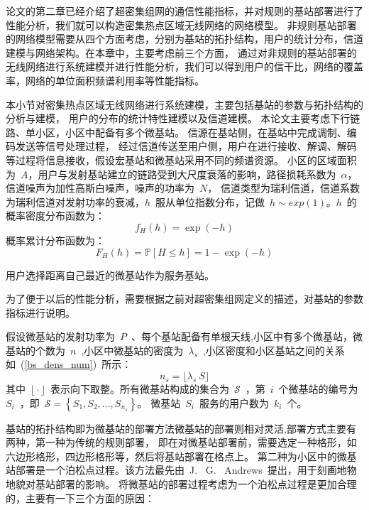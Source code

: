 

论文的第二章已经介绍了超密集组网的通信性能指标，并对规则的基站部署进行了性能分析，我们就可以构造密集热点区域无线网络的网络模型。
非规则基站部署的网络模型需要从四个方面考虑，分别为基站的拓扑结构，用户的统计分布，信道建模与网络架构。在本章中，主要考虑前三个方面，
通过对非规则的基站部署的无线网络进行系统建模并进行性能分析，我们可以得到用户的信干比，网络的覆盖率，网络的单位面积频谱利用率等性能指标。

本小节对密集热点区域无线网络进行系统建模，主要包括基站的参数与拓扑结构的分析与建模，
用户的分布的统计特性建模以及信道建模。
本论文主要考虑下行链路、单小区，小区中配备有多个微基站。
信源在基站侧，在基站中完成调制、编码发送等信号处理过程，
经过信道传送至用户侧，用户在进行接收、解调、解码等过程将信息接收，假设宏基站和微基站采用不同的频谱资源。
小区的区域面积为~$A$，用户与发射基站建立的链路受到大尺度衰落的影响，路径损耗系数为~$\alpha$，信道噪声为加性高斯白噪声，噪声的功率为~$N$，
信道类型为瑞利信道，信道系数为瑞利信道对发射功率的衰减，$h$~服从单位指数分布，记做~$h\sim exp(1)$。$h$~的概率密度分布函数为：
\begin{equation}\label{h_pdf}
  f_H(h) = \exp(-h)
\end{equation}
概率累计分布函数为：
\begin{equation}\label{h_cdf}
  F_H(h) = \mathbb{P}[H\leq h] = 1 - \exp(-h)
\end{equation}

用户选择距离自己最近的微基站作为服务基站。

为了便于以后的性能分析，需要根据之前对超密集组网定义的描述，对基站的参数指标进行说明。

假设微基站的发射功率为~$P$~、每个基站配备有单根天线,小区中有多个微基站，微基站的个数为~$n$~,小区中微基站的密度为~$\lambda_s$~,小区密度和小区基站之间的关系如~(\ref{bs_dens_num})~所示：
\begin{equation}\label{bs_dens_num}
  n_s = \biggl\lfloor\lambda_s ~ S\biggr\rfloor
\end{equation}
其中~$\biggl\lfloor\cdot\biggr\rfloor$~表示向下取整。所有微基站构成的集合为~$\mathcal{S}$~，第~$i$~个微基站的编号为~$S_i$~，即~$\mathcal{S}=\left\{S_1, S_2,\dots,S_{n_s}\right\}$。
微基站~$S_i$~服务的用户数为~$k_i$~个。

基站的拓扑结构即为微基站的部署方法微基站的部署则相对灵活,部署方式主要有两种，第一种为传统的规则部署，
即在对微基站部署前，需要选定一种格形，如六边形格形，四边形格形等，然后将基站部署在格点上。
第二种为小区中的微基站部署是一个泊松点过程。该方法最先由~J.~ G.~ Andrews~提出，用于刻画地物地貌对基站部署的影响。
将微基站的部署过程考虑为一个泊松点过程是更加合理的，主要有一下三个方面的原因：

